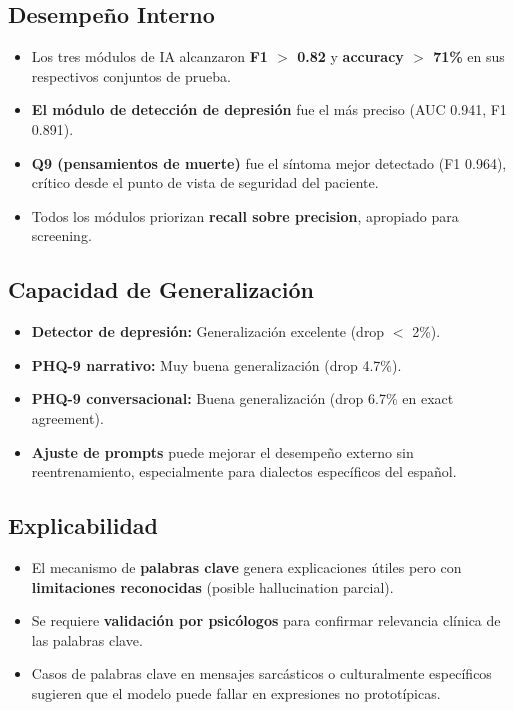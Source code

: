 \subsection{Desempeño Interno}

\begin{itemize}
    \item Los tres módulos de IA alcanzaron \textbf{F1 $>$ 0.82} y
          \textbf{accuracy $>$ 71\%} en sus respectivos conjuntos de prueba.
    \item \textbf{El módulo de detección de depresión} fue el más preciso
          (AUC 0.941, F1 0.891).
    \item \textbf{Q9 (pensamientos de muerte)} fue el síntoma mejor detectado
          (F1 0.964), crítico desde el punto de vista de seguridad del paciente.
    \item Todos los módulos priorizan \textbf{recall sobre precision},
          apropiado para screening.
\end{itemize}

\subsection{Capacidad de Generalización}

\begin{itemize}
    \item \textbf{Detector de depresión:} Generalización excelente (drop $<$ 2\%).
    \item \textbf{PHQ-9 narrativo:} Muy buena generalización (drop 4.7\%).
    \item \textbf{PHQ-9 conversacional:} Buena generalización
          (drop 6.7\% en exact agreement).
    \item \textbf{Ajuste de prompts} puede mejorar el desempeño externo sin reentrenamiento,
          especialmente para dialectos específicos del español.
\end{itemize}

\subsection{Explicabilidad}

\begin{itemize}
    \item El mecanismo de \textbf{palabras clave} genera explicaciones útiles pero con
          \textbf{limitaciones reconocidas} (posible hallucination parcial).
    \item Se requiere \textbf{validación por psicólogos} para confirmar relevancia
          clínica de las palabras clave.
    \item Casos de palabras clave en mensajes sarcásticos o culturalmente específicos
          sugieren que el modelo puede fallar en expresiones no prototípicas.
\end{itemize}

